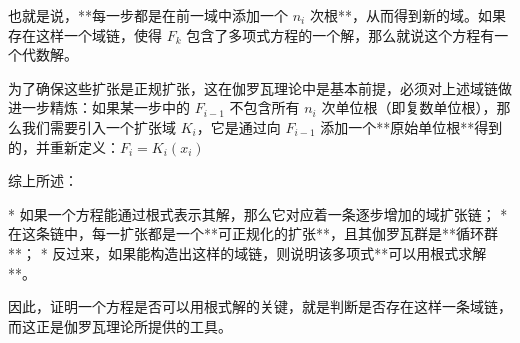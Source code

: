 也就是说，**每一步都是在前一域中添加一个 $n_i$ 次根**，从而得到新的域。如果存在这样一个域链，使得 $F_k$ 包含了多项式方程的一个解，那么就说这个方程有一个代数解。

为了确保这些扩张是正规扩张，这在伽罗瓦理论中是基本前提，必须对上述域链做进一步精炼：如果某一步中的 $F_{i-1}$ 不包含所有 $n_i$ 次单位根（即复数单位根），那么我们需要引入一个扩张域 $K_i$，它是通过向 $F_{i-1}$ 添加一个**原始单位根**得到的，并重新定义：$F_i = K_i(x_i)$

综上所述：

* 如果一个方程能通过根式表示其解，那么它对应着一条逐步增加的域扩张链；
* 在这条链中，每一扩张都是一个**可正规化的扩张**，且其伽罗瓦群是**循环群**；
* 反过来，如果能构造出这样的域链，则说明该多项式**可以用根式求解**。

因此，证明一个方程是否可以用根式解的关键，就是判断是否存在这样一条域链，而这正是伽罗瓦理论所提供的工具。
